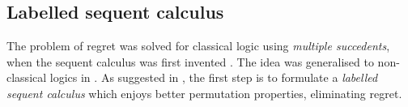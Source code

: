 \documentclass[twoside]{report}
\begin{document}

\subsection*{Labelled sequent calculus}

The problem of regret was solved for classical logic using \emph{multiple succedents}, when the sequent calculus was first invented \cite{gentzen1964investigations}. The idea was generalised to non-classical logics in \cite{wallen1987automated}. As suggested in \cite{waaler2001connections}, the first step is to formulate a \emph{labelled sequent calculus} which enjoys better permutation properties, eliminating regret.
\end{document}

